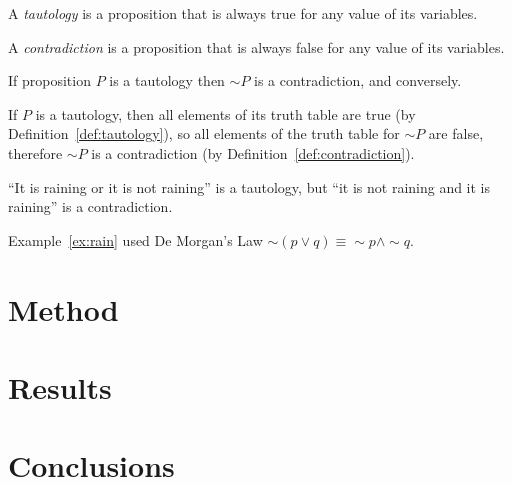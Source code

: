 \documentclass[oneside,12pt]{scrbook}
\begin{document}
\begin{Definition}[Tautology]\label{def:tautology}
A \emph{tautology} is a proposition that is always true for any
value of its variables.
\end{Definition}

\begin{Definition}[Contradiction]\label{def:contradiction}
A \emph{contradiction} is a proposition that is always false for any
value of its variables.
\end{Definition}

\begin{Theorem}
If proposition $P$ is a tautology
then $\sim P$ is a contradiction,
and conversely.
\begin{Proof}
If $P$ is a tautology, then all elements of its truth table are
true (by Definition~\ref{def:tautology}), so all elements of the truth table for $\sim P$ are false,
therefore $\sim P$ is a contradiction (by
Definition~\ref{def:contradiction}).
\end{Proof}
\end{Theorem}

\begin{Example}\label{ex:rain}
``It is raining or it is not raining'' is a tautology,
but ``it is not raining and it is raining'' is a contradiction.
\end{Example}

\begin{Remark}
Example~\ref{ex:rain} used De Morgan’s Law
$\sim (p \vee q) \equiv \sim p \wedge \sim q$.
\end{Remark}

\lipsum

\chapter{Method}
\label{ch:method}

\lipsum

\chapter{Results}
\label{ch:results}

\lipsum

\chapter{Conclusions}
\label{ch:conc}

\lipsum

\backmatter


\end{document}

